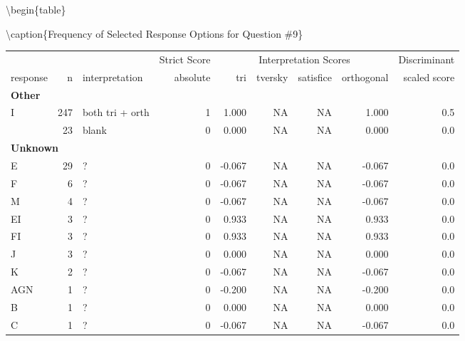 \documentclass[
  letterpaper,
  DIV=11,
  numbers=noendperiod]{scrreprt}
\begin{document}
\textbackslash begin\{table\}

\textbackslash caption\{\label{tab:Q9-RESPONSES}Frequency of Selected
Response Options for Question \#9\} \centering

\begin{tabular}[t]{l|r|l|r|r|r|r|r|r}
\hline
\multicolumn{3}{c|}{ } & \multicolumn{1}{c|}{Strict Score} & \multicolumn{4}{c|}{Interpretation Scores} & \multicolumn{1}{c}{Discriminant} \\
\cline{4-4} \cline{5-8} \cline{9-9}
response & n & interpretation & absolute & tri & tversky & satisfice & orthogonal & scaled score\\
\hline
\multicolumn{9}{l}{\textbf{Other}}\\
\hline
\hspace{1em}I & 247 & both tri + orth & 1 & 1.000 & NA & NA & 1.000 & 0.5\\
\hline
\hspace{1em} & 23 & blank & 0 & 0.000 & NA & NA & 0.000 & 0.0\\
\hline
\multicolumn{9}{l}{\textbf{Unknown}}\\
\hline
\hspace{1em}E & 29 & ? & 0 & -0.067 & NA & NA & -0.067 & 0.0\\
\hline
\hspace{1em}F & 6 & ? & 0 & -0.067 & NA & NA & -0.067 & 0.0\\
\hline
\hspace{1em}M & 4 & ? & 0 & -0.067 & NA & NA & -0.067 & 0.0\\
\hline
\hspace{1em}EI & 3 & ? & 0 & 0.933 & NA & NA & 0.933 & 0.0\\
\hline
\hspace{1em}FI & 3 & ? & 0 & 0.933 & NA & NA & 0.933 & 0.0\\
\hline
\hspace{1em}J & 3 & ? & 0 & 0.000 & NA & NA & 0.000 & 0.0\\
\hline
\hspace{1em}K & 2 & ? & 0 & -0.067 & NA & NA & -0.067 & 0.0\\
\hline
\hspace{1em}AGN & 1 & ? & 0 & -0.200 & NA & NA & -0.200 & 0.0\\
\hline
\hspace{1em}B & 1 & ? & 0 & 0.000 & NA & NA & 0.000 & 0.0\\
\hline
\hspace{1em}C & 1 & ? & 0 & -0.067 & NA & NA & -0.067 & 0.0\\

\end{tabular}
\end{document}
